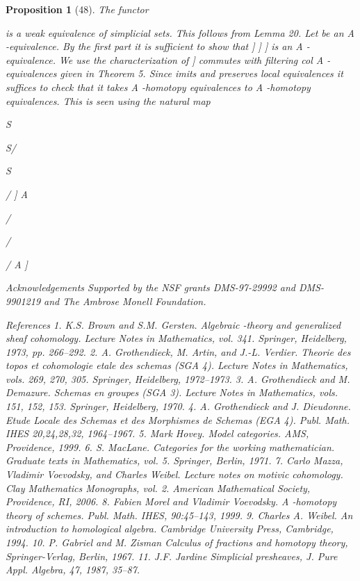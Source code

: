 \documentclass[11pt,a4paper]{article}
\theoremstyle{plain}
\newtheorem{proposition}[theorem]{Proposition}
\theoremstyle{definition}
\begin{document}
\begin{proposition}[48]
The functor

is a weak equivalence of simplicial sets. This follows from Lemma 20.
Let
be an A -equivalence. By the first part it is sufficient to show that
]
]
]
is an A -equivalence. We use the characterization of
] commutes with filtering col
A -equivalences given in Theorem 5. Since 
imits and preserves local equivalences it suffices to check that it takes A -homotopy
equivalences to A -homotopy equivalences. This is seen using the natural map

S 



S/

S

/ ]  A 

/

/

/  A  ]


Acknowledgements Supported by the NSF grants DMS-97-29992 and DMS-9901219 and The
Ambrose Monell Foundation.

References
1. K.S. Brown and S.M. Gersten. Algebraic -theory and generalized sheaf cohomology. Lecture
Notes in Mathematics, vol. 341. Springer, Heidelberg, 1973, pp. 266--292.
2. A. Grothendieck, M. Artin, and J.-L. Verdier. Theorie des topos et cohomologie etale des
schemas (SGA 4). Lecture Notes in Mathematics, vols. 269, 270, 305. Springer, Heidelberg,
1972--1973.
3. A. Grothendieck and M. Demazure. Schemas en groupes (SGA 3). Lecture Notes in Mathematics, vols. 151, 152, 153. Springer, Heidelberg, 1970.
4. A. Grothendieck and J. Dieudonne. Etude Locale des Schemas et des Morphismes de Schemas
(EGA 4). Publ. Math. IHES 20,24,28,32, 1964--1967.
5. Mark Hovey. Model categories. AMS, Providence, 1999.
6. S. MacLane. Categories for the working mathematician. Graduate texts in Mathematics, vol. 5.
Springer, Berlin, 1971.
7. Carlo Mazza, Vladimir Voevodsky, and Charles Weibel. Lecture notes on motivic cohomology.
Clay Mathematics Monographs, vol. 2. American Mathematical Society, Providence, RI, 2006.
8. Fabien Morel and Vladimir Voevodsky. A -homotopy theory of schemes. Publ. Math. IHES,
90:45--143, 1999.
9. Charles A. Weibel. An introduction to homological algebra. Cambridge University Press,
Cambridge, 1994.
10. P. Gabriel and M. Zisman Calculus of fractions and homotopy theory, Springer-Verlag, Berlin,
1967.
11. J.F. Jardine Simplicial presheaves, J. Pure Appl. Algebra, 47, 1987, 35--87.


\end{proposition}
\end{document}
